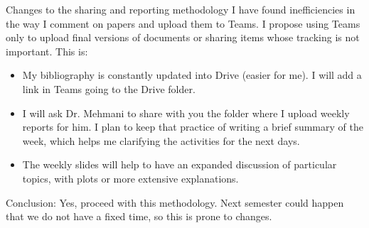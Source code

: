 \documentclass[8pt]{beamer}
\begin{document}
	\begin{frame}{Changes to the sharing and reporting methodology}
		I have found inefficiencies in the way I comment on papers and upload them to Teams. I propose using Teams only to upload final versions of documents or sharing items whose tracking is not important. This is:
		
		\begin{itemize}
			\item My bibliography is constantly updated into Drive (easier for me). I will add a link in Teams going to the Drive folder.
			\item I will ask Dr. Mehmani to share with you the folder where I upload weekly reports for him. I plan to keep that practice of writing a brief summary of the week, which helps me clarifying the activities for the next days. 
			\item The weekly slides will help to have an expanded discussion of particular topics, with plots or more extensive explanations.
		\end{itemize}
		
		{\color{red} Conclusion: Yes, proceed with this methodology. Next semester could happen that we do not have a fixed time, so this is prone to changes.}
	\end{frame}
	
\end{document}
